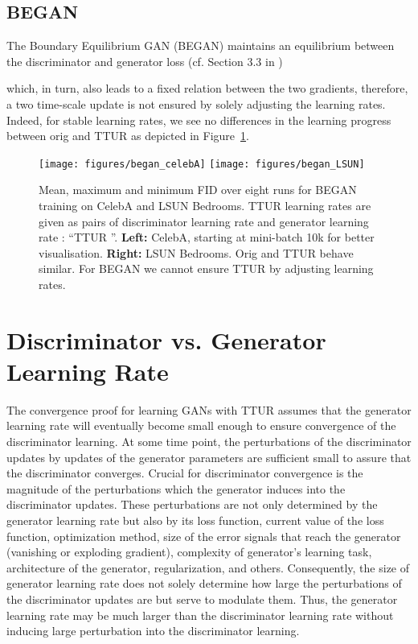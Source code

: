 \documentclass{article}
\begin{document}
\subsection{BEGAN}
The Boundary Equilibrium GAN (BEGAN) \cite{Berthelot:17} maintains an
equilibrium between the discriminator and generator loss (cf. Section 3.3 in
\cite{Berthelot:17})

which, in turn, also leads to a fixed relation
between the two gradients, therefore, a two time-scale update is not ensured by
solely adjusting the learning rates. Indeed, for stable learning rates, we see
no differences in the learning progress between orig and TTUR as depicted in Figure~\ref{fig:began}.

\begin{figure}[H]
\centering
\texttt{[image: figures/began\_celebA]}
\texttt{[image: figures/began\_LSUN]} \caption[FID for
BEGAN trained on CelebA and LSUN Bedrooms.]{Mean, maximum and minimum FID over eight
runs for BEGAN training on CelebA and LSUN Bedrooms. TTUR learning rates are
given as pairs  of discriminator learning rate  and generator learning
rate : ``TTUR  ''.
{\bf Left:} CelebA, starting at mini-batch 10k for better visualisation. {\bf
Right:} LSUN Bedrooms.
Orig and TTUR behave similar. For BEGAN we cannot ensure TTUR by
adjusting learning rates.
  \label{fig:began} }
\end{figure}

\section{Discriminator vs. Generator Learning Rate}
\label{sec:lr}

The convergence proof for learning GANs with TTUR
assumes that the generator learning rate
will eventually become small enough to ensure
convergence of the discriminator learning.
At some time point, the perturbations of the discriminator updates
by updates of the generator parameters are sufficient small
to assure that the discriminator converges.
Crucial for discriminator convergence is the magnitude of the
perturbations which the generator induces into the
discriminator updates.
These perturbations are not only determined by the generator learning
rate but also by its loss function, current value of the loss
function, optimization method, size of the
error signals that reach the generator (vanishing or exploding
gradient), complexity of generator's learning task, architecture of
the generator, regularization, and others.
Consequently, the size of generator learning rate
does not solely determine how
large the perturbations of the discriminator updates are but serve to
modulate them.
Thus, the generator learning rate may be much larger than the
discriminator learning rate without inducing large perturbation into
the discriminator learning.
\end{document}
